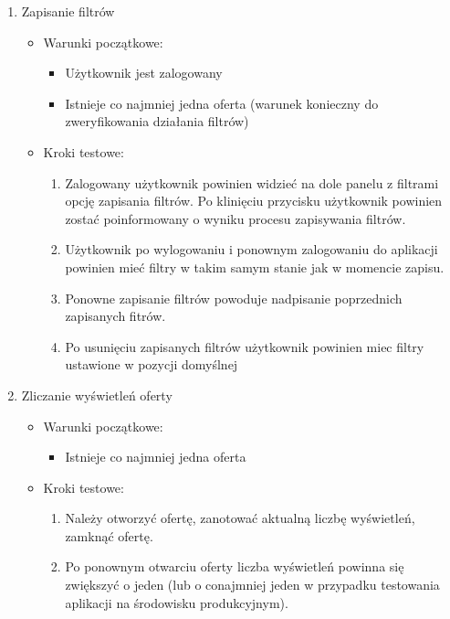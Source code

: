 \begin{enumerate}
 \item Zapisanie filtrów
  \begin{itemize}
   \item Warunki początkowe:
    \begin{itemize}
     \item Użytkownik jest zalogowany
     \item Istnieje co najmniej jedna oferta (warunek konieczny do zweryfikowania działania filtrów)
    \end{itemize}
   \item Kroki testowe:
    \begin{enumerate}
     \item Zalogowany użytkownik powinien widzieć na dole panelu z filtrami opcję zapisania filtrów. Po klinięciu przycisku użytkownik powinien zostać poinformowany o wyniku procesu zapisywania filtrów.
     \item Użytkownik po wylogowaniu i ponownym zalogowaniu do aplikacji powinien mieć filtry w takim samym stanie jak w momencie zapisu.
     \item Ponowne zapisanie filtrów powoduje nadpisanie poprzednich zapisanych fitrów.
     \item Po usunięciu zapisanych filtrów użytkownik powinien miec filtry ustawione w pozycji domyślnej 
    \end{enumerate}
  \end{itemize}

 \item Zliczanie wyświetleń oferty
  \begin{itemize}
   \item Warunki początkowe:
    \begin{itemize}
     \item Istnieje co najmniej jedna oferta
    \end{itemize}
   \item Kroki testowe:
    \begin{enumerate}
     \item Należy otworzyć ofertę, zanotować aktualną liczbę wyświetleń, zamknąć ofertę.
     \item Po ponownym otwarciu oferty liczba wyświetleń powinna się zwiększyć o jeden (lub o conajmniej jeden w przypadku testowania aplikacji na środowisku produkcyjnym).
    \end{enumerate}
  \end{itemize}
\end{enumerate}

